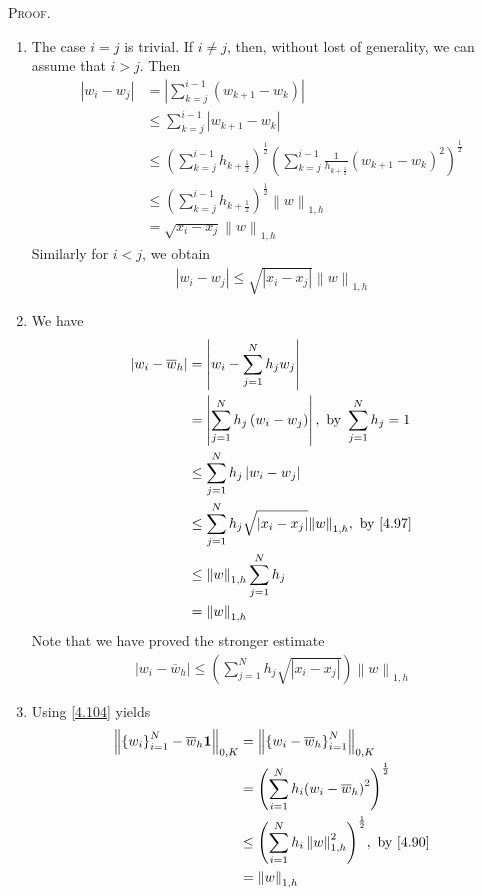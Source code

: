 \documentclass[a4paper]{article}
\numberwithin{equation}{section}
\begin{document}
\textsc{Proof.}
\begin{enumerate}
\item The case $i=j$ is trivial. If $i\ne j$, then, without lost of generality, we can assume that $i>j$. Then
\begin{align}
\left| {{w_i} - {w_j}} \right| &= \left| {\sum\limits_{k = j}^{i - 1} {\left( {{w_{k + 1}} - {w_k}} \right)} } \right|\\
& \le \sum\limits_{k = j}^{i - 1} {\left| {{w_{k + 1}} - {w_k}} \right|} \\
&\le {\left( {\sum\limits_{k = j}^{i - 1} {{h_{k + \frac{1}{2}}}} } \right)^{\frac{1}{2}}}{\left( {\sum\limits_{k = j}^{i - 1} {\frac{1}{{{h_{k + \frac{1}{2}}}}}{{\left( {{w_{k + 1}} - {w_k}} \right)}^2}} } \right)^{\frac{1}{2}}}\\
& \le {\left( {\sum\limits_{k = j}^{i - 1} {{h_{k + \frac{1}{2}}}} } \right)^{\frac{1}{2}}}{\left\| w \right\|_{1,h}}\\
& = \sqrt {{x_i} - {x_j}} {\left\| w \right\|_{1,h}}
\end{align}
Similarly for $i<j$, we obtain 
\begin{align}
\label{4.97}
\left| {{w_i} - {w_j}} \right| \le \sqrt {\left| {{x_i} - {x_j}} \right|} {\left\| w \right\|_{1,h}}
\end{align}
\item We have
\begin{align}
\left| {{w_i} - {{\overline w }_h}} \right| &= \left| {{w_i} - \sum\limits_{j = 1}^N {{h_j}{w_j}} } \right|\\
 &= \left| {\sum\limits_{j = 1}^N {{h_j}\left( {{w_i} - {w_j}} \right)} } \right|,\mbox{ by } \sum\limits_{j = 1}^N {{h_j}}  = 1\\
 &\le \sum\limits_{j = 1}^N {{h_j}\left| {{w_i} - {w_j}} \right|} \\
 &\le \sum\limits_{j = 1}^N {{h_j}\sqrt {\left| {{x_i} - {x_j}} \right|} {{\left\| w \right\|}_{1,h}}} ,\mbox{ by \eqref{4.97}}\\
& \le {\left\| w \right\|_{1,h}}\sum\limits_{j = 1}^N {{h_j}} \\
& = {\left\| w \right\|_{1,h}}
\end{align}
Note that we have proved the stronger estimate
\begin{align}
\label{4.104}
\left| {{w_i} - {{\overline w }_h}} \right| \le \left( {\sum\limits_{j = 1}^N {{h_j}\sqrt {\left| {{x_i} - {x_j}} \right|} } } \right){\left\| w \right\|_{1,h}}
\end{align}
\item Using \eqref{4.104} yields
\begin{align}
{\left\| {{\left\{ {{w_i}} \right\}_{i = 1}^N} - {{\overline{w}}_h}\mathbf{1}} \right\|_{0,K}} &= {\left\| {\left\{ {{w_i} - {{\overline{w}}_h}} \right\}_{i = 1}^N} \right\|_{0,K}}\\
& = {\left( {\sum\limits_{i = 1}^N {{h_i}{{\left( {{w_i} - {{\overline{w}}_h}} \right)}^2}} } \right)^{\frac{1}{2}}}\\
 &\le {\left( {\sum\limits_{i = 1}^N {{h_i}\left\| w \right\|_{1,h}^2} } \right)^{\frac{1}{2}}},\mbox{ by \eqref{4.90}}\\
& = {\left\| w \right\|_{1,h}}
\end{align}
\end{enumerate}
\end{document}
